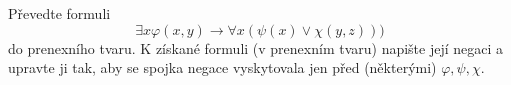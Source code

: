 \subsubsection{}
Převedte formuli $$\exists x \varphi (x,y) \rightarrow \forall x(\psi(x)\vee
\chi (y,z)))$$ do prenexního tvaru. K získané formuli (v prenexním tvaru)
napište její negaci a upravte ji tak, aby se spojka negace vyskytovala jen před
(některými) $\varphi, \psi, \chi$.
